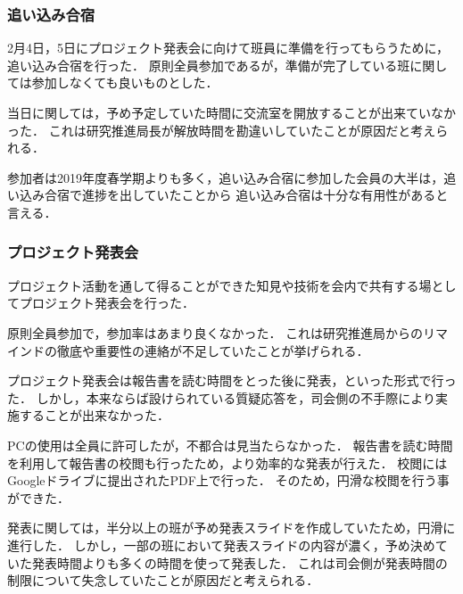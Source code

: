 \subsubsection*{追い込み合宿}
2月4日，5日にプロジェクト発表会に向けて班員に準備を行ってもらうために，追い込み合宿を行った．
原則全員参加であるが，準備が完了している班に関しては参加しなくても良いものとした．

当日に関しては，予め予定していた時間に交流室を開放することが出来ていなかった．
これは研究推進局長が解放時間を勘違いしていたことが原因だと考えられる．

参加者は2019年度春学期よりも多く，追い込み合宿に参加した会員の大半は，追い込み合宿で進捗を出していたことから
追い込み合宿は十分な有用性があると言える．

\subsubsection*{プロジェクト発表会}
プロジェクト活動を通して得ることができた知見や技術を会内で共有する場としてプロジェクト発表会を行った．

原則全員参加で，参加率はあまり良くなかった．
これは研究推進局からのリマインドの徹底や重要性の連絡が不足していたことが挙げられる．

プロジェクト発表会は報告書を読む時間をとった後に発表，といった形式で行った．
しかし，本来ならば設けられている質疑応答を，司会側の不手際により実施することが出来なかった．

PCの使用は全員に許可したが，不都合は見当たらなかった．
報告書を読む時間を利用して報告書の校閲も行ったため，より効率的な発表が行えた．
校閲にはGoogleドライブに提出されたPDF上で行った．
そのため，円滑な校閲を行う事ができた．

発表に関しては，半分以上の班が予め発表スライドを作成していたため，円滑に進行した．
しかし，一部の班において発表スライドの内容が濃く，予め決めていた発表時間よりも多くの時間を使って発表した．
これは司会側が発表時間の制限について失念していたことが原因だと考えられる．


